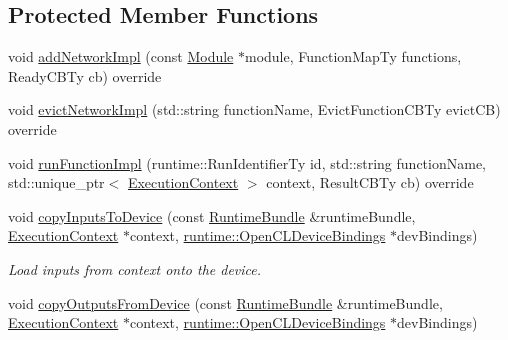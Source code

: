 \subsection*{Protected Member Functions}
\begin{DoxyCompactItemize}
\item 
void \hyperlink{classglow_1_1runtime_1_1_open_c_l_device_manager_a062d49988e839e94d4b56ef18851d0f2}{add\+Network\+Impl} (const \hyperlink{classglow_1_1_module}{Module} $\ast$module, Function\+Map\+Ty functions, Ready\+C\+B\+Ty cb) override
\item 
void \hyperlink{classglow_1_1runtime_1_1_open_c_l_device_manager_ab74a531a691b91c1f16ff21ae6096e33}{evict\+Network\+Impl} (std\+::string function\+Name, Evict\+Function\+C\+B\+Ty evict\+CB) override
\item 
void \hyperlink{classglow_1_1runtime_1_1_open_c_l_device_manager_a1c5fc269e46e652747d1df4e90a5317e}{run\+Function\+Impl} (runtime\+::\+Run\+Identifier\+Ty id, std\+::string function\+Name, std\+::unique\+\_\+ptr$<$ \hyperlink{classglow_1_1_execution_context}{Execution\+Context} $>$ context, Result\+C\+B\+Ty cb) override
\item 
\mbox{\label{classglow_1_1runtime_1_1_open_c_l_device_manager_a32765c7bbc5cb16d79aba7c179ff940e}} 
void \hyperlink{classglow_1_1runtime_1_1_open_c_l_device_manager_a32765c7bbc5cb16d79aba7c179ff940e}{copy\+Inputs\+To\+Device} (const \hyperlink{classglow_1_1runtime_1_1_runtime_bundle}{Runtime\+Bundle} \&runtime\+Bundle, \hyperlink{classglow_1_1_execution_context}{Execution\+Context} $\ast$context, \hyperlink{structglow_1_1runtime_1_1_open_c_l_device_bindings}{runtime\+::\+Open\+C\+L\+Device\+Bindings} $\ast$dev\+Bindings)
\begin{DoxyCompactList}\small\item\em Load inputs from {\ttfamily context} onto the device. \end{DoxyCompactList}\item 
\mbox{\label{classglow_1_1runtime_1_1_open_c_l_device_manager_aef5cd2d2708069573d966faa166d55cf}} 
void \hyperlink{classglow_1_1runtime_1_1_open_c_l_device_manager_aef5cd2d2708069573d966faa166d55cf}{copy\+Outputs\+From\+Device} (const \hyperlink{classglow_1_1runtime_1_1_runtime_bundle}{Runtime\+Bundle} \&runtime\+Bundle, \hyperlink{classglow_1_1_execution_context}{Execution\+Context} $\ast$context, \hyperlink{structglow_1_1runtime_1_1_open_c_l_device_bindings}{runtime\+::\+Open\+C\+L\+Device\+Bindings} $\ast$dev\+Bindings)

\end{DoxyCompactItemize}
